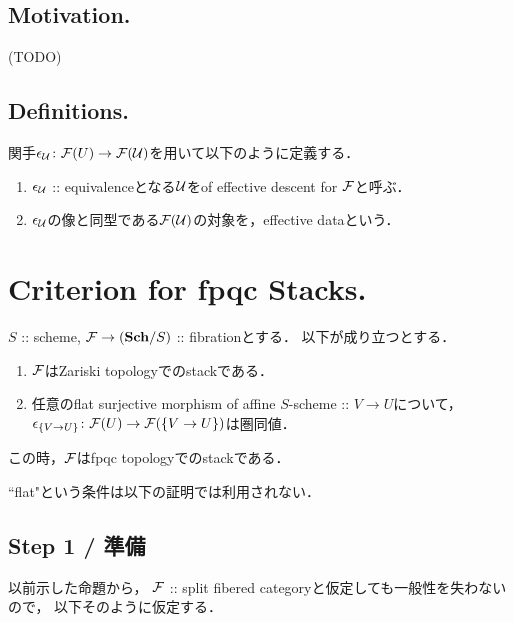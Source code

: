 \documentclass[a4paper, dvipdfmx]{jsarticle}
\begin{document}
\subsection{Motivation.}
    (TODO)

\subsection{Definitions.}
\begin{Def}
    関手$\epsilon_{\mathcal{U}} \colon \mathcal{F}(U) \to \mathcal{F}(\mathcal{U})$を用いて以下のように定義する．
    \begin{enumerate}[label=(\roman*)]
        \item
            $\epsilon_{\mathcal{U}}$ :: equivalenceとなる$\mathcal{U}$をof effective descent for $\mathcal{F}$と呼ぶ．
        \item
            $\epsilon_{\mathcal{U}}$の像と同型である$\mathcal{F}(\mathcal{U})$の対象を，effective dataという．
    \end{enumerate}
\end{Def}

\section{Criterion for fpqc Stacks.}
\begin{Thm}\label{thm:fpqccriterion}
    $S$ :: scheme,
    $\mathcal{F} \to (\mathbf{Sch}/S)$ :: fibrationとする．
    以下が成り立つとする．
    \begin{enumerate}[label=(\alph*)]
        \item $\mathcal{F}$はZariski topologyでのstackである．
        \item
            任意のflat surjective morphism of affine $S$-scheme :: $V \to U$について，\mnewline
            $\epsilon_{\{V \to U\}} \colon \mathcal{F}(U) \to \mathcal{F}(\{V \to U\})$は圏同値．
    \end{enumerate}
    この時，$\mathcal{F}$はfpqc topologyでのstackである．
\end{Thm}

\begin{Remark}
    ``flat"という条件は以下の証明では利用されない．
\end{Remark}

\subsection{Step 1 / 準備}
以前示した命題から，
$\mathcal{F}$ :: split fibered categoryと仮定しても一般性を失わないので，
以下そのように仮定する．
\end{document}
